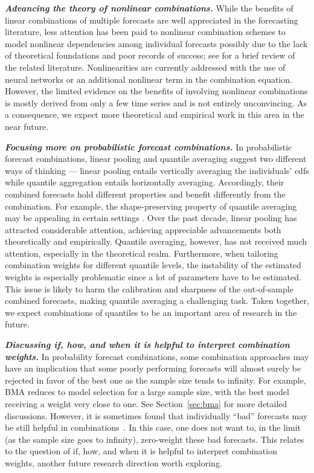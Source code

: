 \documentclass[a4paper,11pt]{article}
\begin{document}
\textbf{\textit{Advancing the theory of nonlinear combinations.}} While the benefits of linear combinations of multiple forecasts are well appreciated in the forecasting literature, less attention has been paid to nonlinear combination schemes to model nonlinear dependencies among individual forecasts possibly due to the lack of theoretical foundations and poor records of success; see \citet{Timmermann2006-en} for a brief review of the related literature. Nonlinearities are currently addressed with the use of neural networks or an additional nonlinear term in the combination equation. However, the limited evidence on the benefits of involving nonlinear combinations is mostly derived from only a few time series and is not entirely unconvincing. As a consequence, we expect more theoretical and empirical work in this area in the near future.

\textbf{\textit{Focusing more on probabilistic forecast combinations.}} In probabilistic forecast combinations, linear pooling and quantile averaging suggest two different ways of thinking --- linear pooling entails vertically averaging the individuals' cdfs while quantile aggregation entails horizontally averaging. Accordingly, their combined forecasts hold different properties and benefit differently from the combination. For example, the shape-preserving property of quantile averaging may be appealing in certain settings \citep{Lichtendahl2013-rt}. Over the past decade, linear pooling has attracted considerable attention, achieving appreciable advancements both theoretically and empirically. Quantile averaging, however, has not received much attention, especially in the theoretical realm. Furthermore, when tailoring combination weights for different quantile levels, the instability of the estimated weights is especially problematic since a lot of parameters have to be estimated. This issue is likely to harm the calibration and sharpness of the out-of-sample combined forecasts, making quantile averaging a challenging task. Taken together, we expect combinations of quantiles to be an important area of research in the future.

\textbf{\textit{Discussing if, how, and when it is helpful to interpret combination weights.}} In probability forecast combinations, some combination approaches may have an implication that some poorly performing forecasts will almost surely be rejected in favor of the best one as the sample size tends to infinity. For example, BMA reduces to model selection for a large sample size, with the best model receiving a weight very close to one. See Section~\ref{sec:bma} for more detailed discussions. However, it is sometimes found that individually ``bad'' forecasts may be still helpful in combinations~\citep[e.g.,][]{Geweke2011-xk}. In this case, one does not want to, in the limit (as the sample size goes to infinity), zero-weight these bad forecasts. This relates to the question of if, how, and when it is helpful to interpret combination weights, another future research direction worth exploring.
\end{document}
